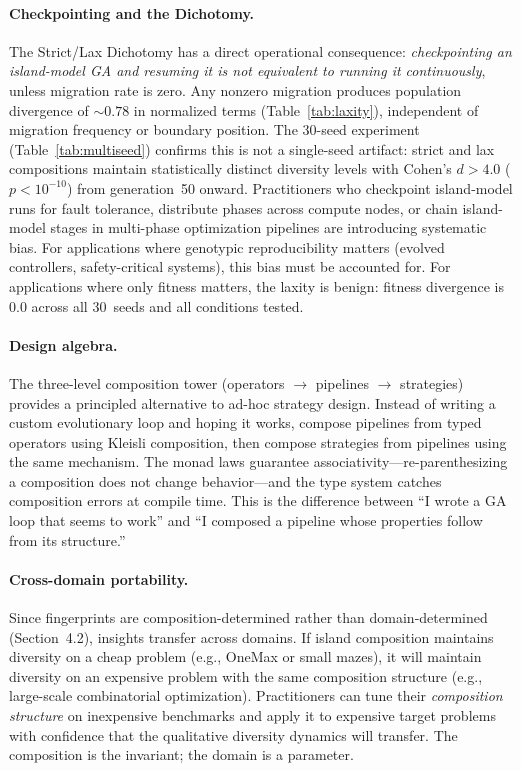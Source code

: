 \documentclass[sigconf,anonymous]{acmart}
\begin{document}
\paragraph{Checkpointing and the Dichotomy.}
The Strict/Lax Dichotomy has a direct operational consequence: \emph{checkpointing an island-model GA and resuming it is not equivalent to running it continuously}, unless migration rate is zero. Any nonzero migration produces population divergence of ${\sim}0.78$ in normalized terms (Table~\ref{tab:laxity}), independent of migration frequency or boundary position. The 30-seed experiment (Table~\ref{tab:multiseed}) confirms this is not a single-seed artifact: strict and lax compositions maintain statistically distinct diversity levels with Cohen's $d > 4.0$ ($p < 10^{-10}$) from generation~50 onward. Practitioners who checkpoint island-model runs for fault tolerance, distribute phases across compute nodes, or chain island-model stages in multi-phase optimization pipelines are introducing systematic bias. For applications where genotypic reproducibility matters (evolved controllers, safety-critical systems), this bias must be accounted for. For applications where only fitness matters, the laxity is benign: fitness divergence is 0.0 across all 30~seeds and all conditions tested.

\paragraph{Design algebra.}
The three-level composition tower (operators $\to$ pipelines $\to$ strategies) provides a principled alternative to ad-hoc strategy design. Instead of writing a custom evolutionary loop and hoping it works, compose pipelines from typed operators using Kleisli composition, then compose strategies from pipelines using the same mechanism. The monad laws guarantee associativity---re-parenthesizing a composition does not change behavior---and the type system catches composition errors at compile time. This is the difference between ``I wrote a GA loop that seems to work'' and ``I composed a pipeline whose properties follow from its structure.''

\paragraph{Cross-domain portability.}
Since fingerprints are composition-determined rather than domain-determined (Section~4.2), insights transfer across domains. If island composition maintains diversity on a cheap problem (e.g., OneMax or small mazes), it will maintain diversity on an expensive problem with the same composition structure (e.g., large-scale combinatorial optimization). Practitioners can tune their \emph{composition structure} on inexpensive benchmarks and apply it to expensive target problems with confidence that the qualitative diversity dynamics will transfer. The composition is the invariant; the domain is a parameter.
\end{document}
